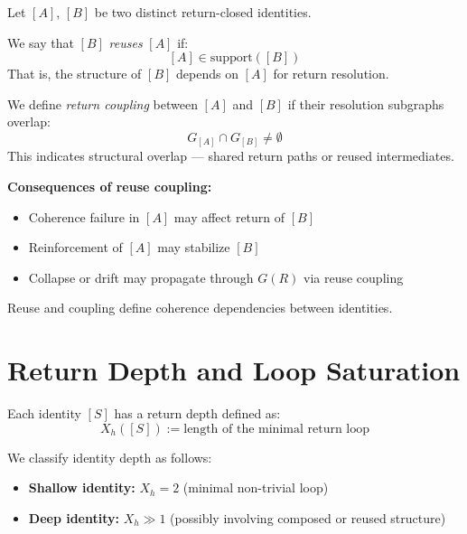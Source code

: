 Let $[A]$, $[B]$ be two distinct return-closed identities.

\begin{definition}[Reuse] \label{def:reuse}
We say that $[B]$ \textit{reuses} $[A]$ if:
\begin{equation} \label{eq:reuse-condition}
[A] \in \text{support}([B])
\end{equation}
That is, the structure of $[B]$ depends on $[A]$ for return resolution.
\end{definition}

\begin{definition} \label{def:coupling}
We define \textit{return coupling} between $[A]$ and $[B]$ if their resolution subgraphs overlap:
\begin{equation} \label{eq:coupling-condition}
G_{[A]} \cap G_{[B]} \neq \emptyset
\end{equation}
This indicates structural overlap — shared return paths or reused intermediates.
\end{definition}

\textbf{Consequences of reuse coupling:}
\begin{itemize}
  \item Coherence failure in $[A]$ may affect return of $[B]$
  \item Reinforcement of $[A]$ may stabilize $[B]$
  \item Collapse or drift may propagate through $G(R)$ via reuse coupling
\end{itemize}

Reuse and coupling define coherence dependencies between identities.

\section{Return Depth and Loop Saturation}

Each identity $[S]$ has a return depth defined as:
\begin{equation} \label{eq:return-depth}
X_h([S]) := \text{length of the minimal return loop}
\end{equation}

We classify identity depth as follows:
\begin{itemize}
  \item \textbf{Shallow identity:} $X_h = 2$ (minimal non-trivial loop)
  \item \textbf{Deep identity:} $X_h \gg 1$ (possibly involving composed or reused structure)
\end{itemize}

